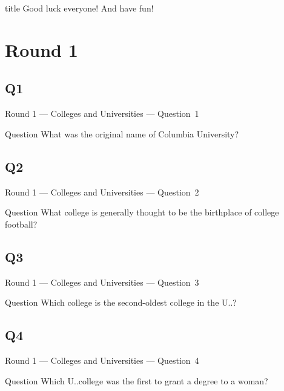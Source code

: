 \documentclass[11pt,draft]{beamer}
\begin{document}
\begingroup{}
\begin{frame}
    \vfill{}
    \begin{beamercolorbox}[sep=8pt,center,shadow=true,rounded=true]{title}
        Good luck everyone! And have fun!
    \end{beamercolorbox}
    \vfill{}
\end{frame}
\endgroup{}
\def\thisSectionName{Colleges and Universities}
\section{Round 1}
\subsection*{Q1}
\begin{frame}[t]{Round 1 --- Colleges and Universities --- \mbox{Question 1}}
    \begin{block}{Question}
        What was the original name of Columbia University?
    \end{block}
\end{frame}
\subsection*{Q2}
\begin{frame}[t]{Round 1 --- Colleges and Universities --- \mbox{Question 2}}
    \begin{block}{Question}
        What college is generally  thought to be the birthplace of college football?
    \end{block}
\end{frame}
\subsection*{Q3}
\begin{frame}[t]{Round 1 --- Colleges and Universities --- \mbox{Question 3}}
    \begin{block}{Question}
        Which college is the second-oldest college in the U.\@S.\@?
    \end{block}
\end{frame}
\subsection*{Q4}
\begin{frame}[t]{Round 1 --- Colleges and Universities --- \mbox{Question 4}}
    \begin{block}{Question}
        Which U.\@S.\@ college was the first to grant a degree to a woman?
    \end{block}
\end{frame}
\end{document}

